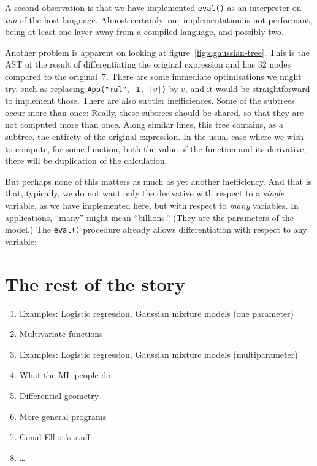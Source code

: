 \documentclass[11pt, a4paper]{article}
\newcommand{\cd}[1]{\texttt{#1}}
\begin{document}
A second observation is that we have implemented \cd{eval()} as an
interpreter on \emph{top} of the host language. Almost certainly, our
implementation is not performant, being at least one layer away from a
compiled language, and possibly two.

Another problem is apparent on looking at
figure~\ref{fig:dgaussian-tree}. This is the AST of the result of
differentiating the original expression and has 32 nodes compared to
the original~7. There are some immediate optimisations we might try,
such as replacing \cd{App("mul", 1, |$v$|)} by $v$, and it would be
straightforward to implement those. There are also subtler
inefficiences. Some of the subtrees occur more than once: Really,
these subtrees should be shared, so that they are not computed more
than once. Along similar lines, this tree contains, as a subtree, the
entirety of the original expression. In the usual case where we wish
to compute, for some function, both the value of the function and its
derivative, there will be duplication of the calculation.

But perhaps none of this matters as much as yet another
inefficiency. And that is that, typically, we do not want only the
derivative with respect to a \emph{single} variable, as we have
implemented here, but with respect to \emph{many} variables. In
applications, ``many'' might mean ``billions.'' (They are the
parameters of the model.) The \cd{eval()} procedure already allows
differentiation with respect to any variable;


\section{The rest of the story}

\begin{enumerate}
\item Examples: Logistic regression, Gaussian mixture models (one parameter)
\item Multivariate functions
\item Examples: Logistic regression, Gaussian mixture models (multiparameter)
\item What the ML people do 
\item Differential geometry
\item More general programs
\item Conal Elliot's stuff
\item \dots
\end{enumerate}
\end{document}
